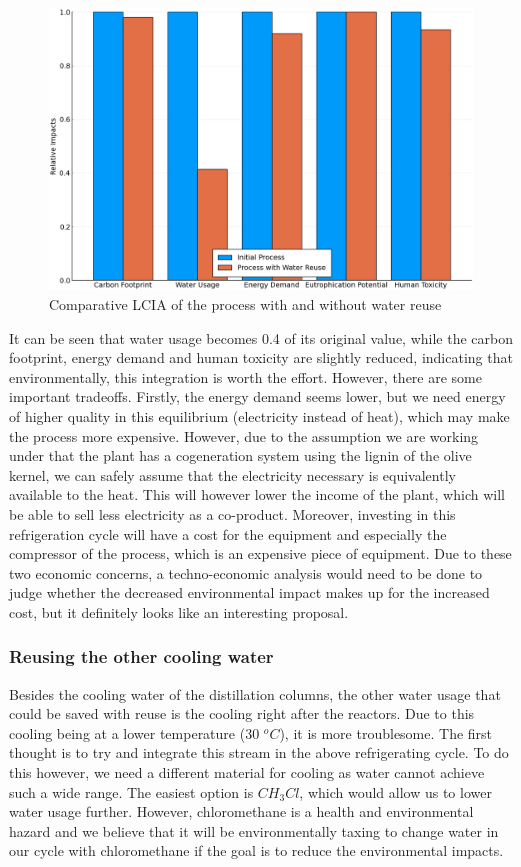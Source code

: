 \documentclass[11pt]{article}
\begin{document}
\begin{figure}[htbp]
\centering
\includegraphics[width=.9\linewidth]{./lcia_comparison_reuse.png}
\caption{Comparative LCIA of the process with and without water reuse}
\end{figure}

It can be seen that water usage becomes 0.4 of its original value, while the carbon footprint, energy demand and human toxicity are slightly reduced, indicating that environmentally, this integration is worth the effort. However, there are some important tradeoffs. Firstly, the energy demand seems lower, but we need energy of higher quality in this equilibrium (electricity instead of heat), which may make the process more expensive. However, due to the assumption we are working under that the plant has a cogeneration system using the lignin of the olive kernel, we can safely assume that the electricity necessary is equivalently available to the heat. This will however lower the income of the plant, which will be able to sell less electricity as a co-product. Moreover, investing in this refrigeration cycle will have a cost for the equipment and especially the compressor of the process, which is an expensive piece of equipment. Due to these two economic concerns, a techno-economic analysis would need to be done to judge whether the decreased environmental impact makes up for the increased cost, but it definitely looks like an interesting proposal.

\subsubsection{Reusing the other cooling water}
\label{sec:org698a6e7}
Besides the cooling water of the distillation columns, the other water usage that could be saved with reuse is the cooling right after the reactors. Due to this cooling being at a lower temperature (30 \(^oC\)), it is more troublesome. The first thought is to try and integrate this stream in the above refrigerating cycle. To do this however, we need a different material for cooling as water cannot achieve such a wide range. The easiest option is \(CH_3Cl\), which would allow us to lower water usage further. However, chloromethane is a health and environmental hazard and we believe that it will be environmentally taxing to change water in our cycle with chloromethane if the goal is to reduce the environmental impacts.
\end{document}
